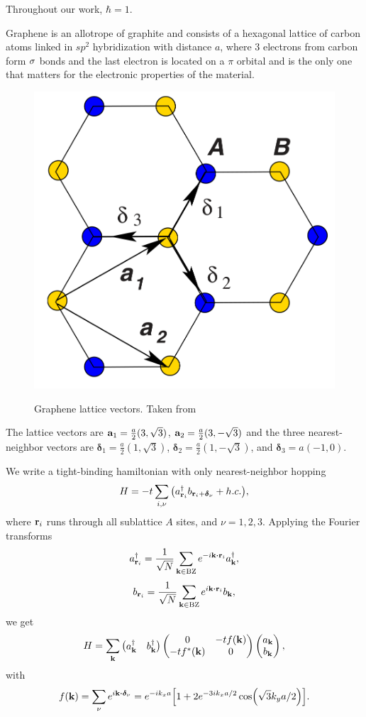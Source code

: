 \documentclass[a4paper,10pt]{article}
\begin{document}
Throughout our work, $\hbar = 1$.

\n

Graphene is an allotrope of graphite and consists of a hexagonal lattice of carbon atoms linked in $sp^2$ hybridization with distance $a$, where $3$ electrons from carbon form $\sigma$ bonds and the last electron is located on a $\pi$ orbital and is the only one that matters for the electronic properties of the material.

\begin{figure}[H]
\centering
\includegraphics[width=0.3\linewidth]{fig/graphene-lattice_vectors.png}
\label{fig:graphene-lattice_vectors}
\caption{Graphene lattice vectors. Taken from \cite{geim2009}}
\end{figure}

The lattice vectors are $\vb{a}_1 = \frac{a}{2} (3, \sqrt{3})$, $\vb{a}_2 = \frac{a}{2} (3, -\sqrt{3})$ and the three nearest-neighbor vectors are $\bm{\delta}_1 = \frac{a}{2} (1, \sqrt{3})$, $\bm{\delta}_2 = \frac{a}{2} (1, -\sqrt{3})$, and $\bm{\delta}_3 = a (-1, 0)$.

We write a tight-binding hamiltonian with only nearest-neighbor hopping
$$
H = -t \sum_{i,\nu} \qty(a^\dagger_{\vb{r}_i} b_{\vb{r}_i + \bm{\delta}_\nu} + h.c. ),
$$
where $\vb{r}_i$ runs through all sublattice $A$ sites, and $\nu = 1, 2, 3$. Applying the Fourier transforms
$$
a_{\r_i}^\d = \frac{1}{\sqrt{N}} \sum_{\k \in \text{BZ}} e^{-i \k \vdot \r_i} a_{\k}^\d,
$$
$$
b_{\r_i} = \frac{1}{\sqrt{N}} \sum_{\k \in \text{BZ}} e^{i \k \vdot \r_i} b_{\k},
$$
we get
$$
H = \sum_{\vb{k}}
\begin{pmatrix}
a_{\vb{k}}^\dagger & b_{\vb{k}}^\dagger
\end{pmatrix}
\begin{pmatrix}
0 & -t f(\vb{k}) \\
-t f^*(\vb{k}) & 0
\end{pmatrix}
\begin{pmatrix}
a_{\vb{k}} \\ b_{\vb{k}}
\end{pmatrix},
$$
with
$$
f(\k) = \sum_{\nu} e^{i \k \vdot \bm{\delta}_\nu} =
e^{-i k_x a} \qty[ 1 + 2 e^{-3ik_x a / 2} \cos(\sqrt{3} k_y a / 2) ].
$$
\end{document}
